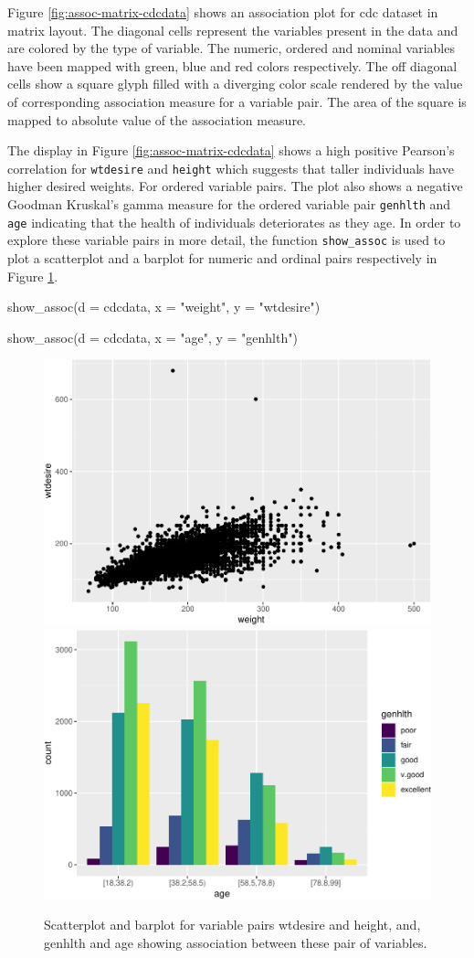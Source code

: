 Figure \ref{fig:assoc-matrix-cdcdata} shows an association plot for cdc
dataset in matrix layout. The diagonal cells represent the variables
present in the data and are colored by the type of variable. The
numeric, ordered and nominal variables have been mapped with green, blue
and red colors respectively. The off diagonal cells show a square glyph
filled with a diverging color scale rendered by the value of
corresponding association measure for a variable pair. The area of the
square is mapped to absolute value of the association measure.

The display in Figure \ref{fig:assoc-matrix-cdcdata} shows a high
positive Pearson's correlation for \texttt{wtdesire} and \texttt{height}
which suggests that taller individuals have higher desired weights. For
ordered variable pairs. The plot also shows a negative Goodman Kruskal's
gamma measure for the ordered variable pair \texttt{genhlth} and
\texttt{age} indicating that the health of individuals deteriorates as
they age. In order to explore these variable pairs in more detail, the
function \texttt{show\_assoc} is used to plot a scatterplot and a
barplot for numeric and ordinal pairs respectively in Figure
\ref{fig:int-pairs-cdcdata}.

\begin{Schunk}
\begin{Sinput}
show_assoc(d = cdcdata,
           x = "weight",
           y = "wtdesire")

show_assoc(d = cdcdata,
           x = "age",
           y = "genhlth")
\end{Sinput}
\begin{figure}
\includegraphics[width=0.5\linewidth]{rj_paper_files/figure-latex/int-pairs-cdcdata-1} \includegraphics[width=0.5\linewidth]{rj_paper_files/figure-latex/int-pairs-cdcdata-2} \caption[Scatterplot and barplot for variable pairs wtdesire and height, and, genhlth  and age showing association between these pair of variables]{Scatterplot and barplot for variable pairs wtdesire and height, and, genhlth  and age showing association between these pair of variables.}\label{fig:int-pairs-cdcdata}
\end{figure}
\end{Schunk}

